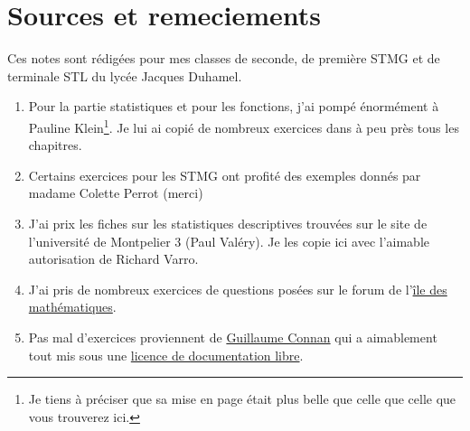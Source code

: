 
\section*{Sources et remeciements}

Ces notes sont rédigées pour mes classes de seconde, de première STMG et de terminale STL du lycée Jacques Duhamel.

\begin{enumerate}
    \item
        
        Pour la partie statistiques et pour les fonctions, j'ai pompé énormément à Pauline Klein\footnote{Je tiens à préciser que sa mise en page était plus belle que celle que celle que vous trouverez ici.}. Je lui ai copié de nombreux exercices dans à peu près tous les chapitres.

    \item

        Certains exercices pour les STMG ont profité des exemples donnés par madame Colette Perrot (merci) 
    \item
        J'ai prix les fiches \cite{qyKnLf} sur les statistiques descriptives trouvées sur le site de l'université de Montpelier 3 (Paul Valéry). Je les copie ici avec l'aimable autorisation de Richard Varro.
    \item
        J'ai pris de nombreux exercices de questions posées sur le forum de l'\href{http://www.ilemaths.net/forum_lycee.php}{île des mathématiques}.
    \item
        Pas mal d'exercices proviennent de \href{http://tehessin.tuxfamily.org/?page=35}{Guillaume Connan} qui a aimablement tout mis sous une \href{http://guilde.jeunes-chercheurs.org/Guilde/Licence/ldl.html}{licence de documentation libre}.

\end{enumerate}
